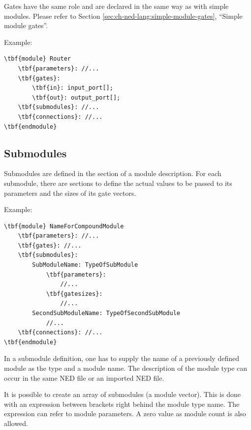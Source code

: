 

Gates have the same role and are declared in the same way
as with simple modules. Please refer to Section
\ref{sec:ch-ned-lang:simple-module-gates}, ``Simple module gates''.


Example:
\begin{Verbatim}[commandchars=\\\{\}]
\tbf{module} Router
    \tbf{parameters}: //...
    \tbf{gates}:
        \tbf{in}: input_port[];
        \tbf{out}: output_port[];
    \tbf{submodules}: //...
    \tbf{connections}: //...
\tbf{endmodule}
\end{Verbatim}





\subsection{Submodules}


Submodules are defined in the
 section of a
module description. For each submodule, there are sections to define
the actual values to be passed to its parameters and the sizes of its
gate vectors.

Example:

\begin{Verbatim}[commandchars=\\\{\}]
\tbf{module} NameForCompoundModule
    \tbf{parameters}: //...
    \tbf{gates}: //...
    \tbf{submodules}:
        SubModuleName: TypeOfSubModule
            \tbf{parameters}:
                //...
            \tbf{gatesizes}:
                //...
        SecondSubModuleName: TypeOfSecondSubModule
            //...
    \tbf{connections}: //...
\tbf{endmodule}
\end{Verbatim}

In a submodule definition, one has to supply the name of a previously
defined module as the type and a module name. The description of the
module type can occur in the same NED file or an imported NED file.




It is possible to create an array of
submodules (a module
vector).  This is done with an expression between
brackets right behind the module type name. The expression can refer
to module parameters.  A zero value as module count is also allowed.

